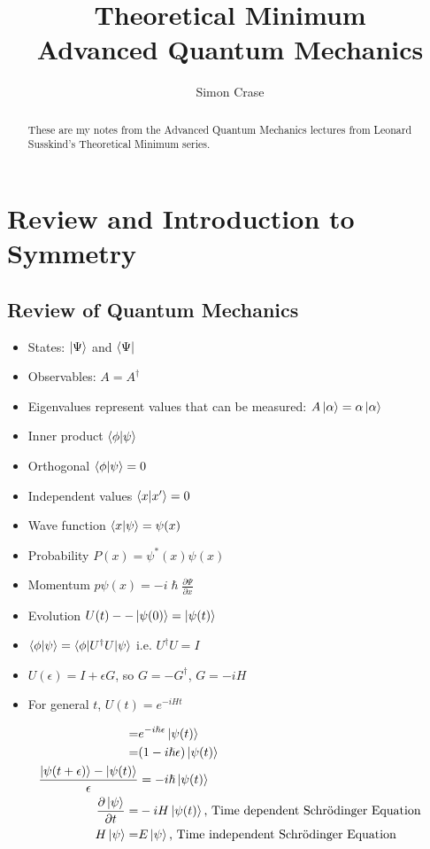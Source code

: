 \documentclass[]{article}
\title{Theoretical Minimum\\Advanced Quantum Mechanics}
\author{Simon Crase}
\begin{document}
\maketitle

\begin{abstract}
These are my notes from the Advanced Quantum Mechanics lectures from Leonard Susskind's Theoretical Minimum series.
\end{abstract}

\tableofcontents

\section{Review and Introduction to Symmetry}

\subsection{Review of Quantum Mechanics}

\begin{itemize}
	\item States: $\ket{\Psi}$ and $\bra{\Psi}$
	\item Observables: $A=A^{\dag}$
	\item Eigenvalues represent values that can be measured: $A\ket{\alpha} = \alpha\ket{\alpha}$
	\item Inner product $\braket{\phi|\psi}$	
	\item Orthogonal $\braket{\phi|\psi}=0$
	\item Independent values $\braket{x|x^{\prime}}=0$
	\item Wave function $\braket{x|\psi} = \psi(x)$
	\item Probability $P(x)=\psi^*(x)\psi(x)$
	\item Momentum $p\psi(x)=- i \hslash \frac{\partial \Psi}{\partial x}$
	\item Evolution $U(t)-- \ket{\psi(0)} = \ket{\psi(t)}$
	\item $\braket{\phi|\psi}=\braket{\phi|U^{\dagger}U|\psi}$ i.e. $U^{\dagger}U=I$
	\item $U(\epsilon)= I + \epsilon G$, so $G=-G^{\dagger}$, $G=- i H$
	\item For general $t$, $U(t)=e^{- i H t}$
\end{itemize}

\begin{align*}
=& e^{-i \hslash \epsilon} \ket{\psi(t)}\\
=& (1- i \hslash \epsilon)\ket{\psi(t)}\\
\frac{\ket{\psi(t+\epsilon)} -\ket{\psi(t)} }{\epsilon}&= -i \hslash \ket{\psi(t)}\\
\frac{\partial \ket{\psi}}{\partial t} =& -i H \ket{\psi(t)} \text{, Time dependent Schr\"odinger Equation}\\
H \ket{\psi} =& E \ket{\psi}\text{, Time independent Schr\"odinger Equation}
\end{align*} 
\end{document}
